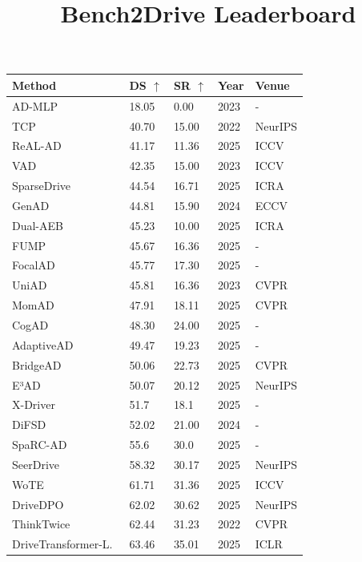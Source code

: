\documentclass[10pt,twocolumn,letterpaper]{article}
\title{Bench2Drive Leaderboard}
\begin{document}
\begin{table}[t]
\setlength{\tabcolsep}{4pt}
\small
\centering
\begin{tabular}{l|ll|ll}
\toprule
\textbf{Method} & \textbf{DS} $\uparrow$ & \textbf{SR} $\uparrow$ & \textbf{Year} & \textbf{Venue} \\
\midrule
AD-MLP~\cite{Zhai2023ARXIV} & 18.05 & 0.00 & 2023 & - \\
TCP~\cite{Wu2022NeurIPS} & 40.70 & 15.00 & 2022 & NeurIPS \\
ReAL-AD~\cite{Lu2025ICCV} & 41.17 & 11.36 & 2025 & ICCV \\
VAD~\cite{Jiang2023ICCV} & 42.35 & 15.00 & 2023 & ICCV \\
SparseDrive~\cite{Sun2025ICRA} & 44.54 & 16.71 & 2025 & ICRA \\
GenAD~\cite{Zheng2024ECCV} & 44.81 & 15.90 & 2024 & ECCV \\
Dual-AEB~\cite{Zhang2025ICRA} & 45.23 & 10.00 & 2025 & ICRA \\
FUMP~\cite{Liu2025ARXIVc} & 45.67 & 16.36 & 2025 & - \\
FocalAD~\cite{Sun2025ARXIV} & 45.77 & 17.30 & 2025 & - \\
UniAD~\cite{Hu2023CVPR} & 45.81 & 16.36 & 2023 & CVPR \\
MomAD~\cite{Song2025CVPR} & 47.91 & 18.11 & 2025 & CVPR \\
CogAD~\cite{Wang2025ARXIV} & 48.30 & 24.00 & 2025 & - \\
AdaptiveAD~\cite{Tang2025ARXIV} & 49.47 & 19.23 & 2025 & - \\
BridgeAD~\cite{Zhang2025CVPR} & 50.06 & 22.73 & 2025 & CVPR \\
E³AD~\cite{Niu2025NEURIPS} & 50.07 & 20.12 & 2025 & NeurIPS \\
X-Driver~\cite{Liu2025ARXIVb} & 51.7 & 18.1 & 2025 & - \\
DiFSD~\cite{Su2024ARXIV} & 52.02 & 21.00 & 2024 & - \\
SpaRC-AD~\cite{Wolters2025ICCVWORK} & 55.6 & 30.0 & 2025 & - \\
SeerDrive~\cite{Zhang2025NEURIPS} & 58.32 & 30.17 & 2025 & NeurIPS \\
WoTE~\cite{Li2025ICCV} & 61.71 & 31.36 & 2025 & ICCV \\
DriveDPO~\cite{Shang2025NEURIPS} & 62.02 & 30.62 & 2025 & NeurIPS \\
ThinkTwice~\cite{Jia2023CVPR} & 62.44 & 31.23 & 2022 & CVPR \\
DriveTransformer-L.~\cite{Jia2025ICLR} & 63.46 & 35.01 & 2025 & ICLR \\

\end{tabular}
\end{table}
\end{document}
